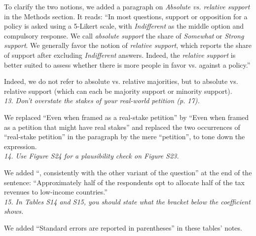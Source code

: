 \documentclass[12pt,english]{article}
\begin{document}
To clarify the two notions, we added a paragraph on \textit{Absolute vs. relative support} in the Methods section. It reads: ``In most questions, support or opposition for a policy is asked using a 5-Likert scale, with \textit{Indifferent} as the middle option and compulsory response. We call \textit{absolute support} the share of \textit{Somewhat} or \textit{Strong support}. We generally favor the notion of \textit{relative support}, which reports the share of support after excluding \textit{Indifferent} answers. Indeed, the \textit{relative support} is better suited to assess whether there is more people in favor vs. against a policy.''

Indeed, we do not refer to absolute vs. relative majorities, but to absolute vs. relative support (which can each be majority support or minority support).
~\\


\textit{13. Don’t overstate the stakes of your real-world petition (p. 17).}

We replaced ``Even when framed as a real-stake petition'' by ``Even when framed as a petition that might have real stakes'' and replaced the two occurrences of ``real-stake petition'' in the paragraph by the mere ``petition'', to tone down the expression.
~\\

\textit{14. Use Figure S24 for a plausibility check on Figure S23.}

We added ``, consistently with the other variant of the question'' at the end of the sentence: ``Approximately half of the respondents opt to allocate half of the tax revenues to low-income countries.''
~\\

\textit{15. In Tables S14 and S15, you should state what the bracket below the coefficient shows.}

We added ``Standard errors are reported in parentheses'' in these tables' notes.

\renewcommand{\url}[1]{\href{#1}{Link}} 

\end{document}
